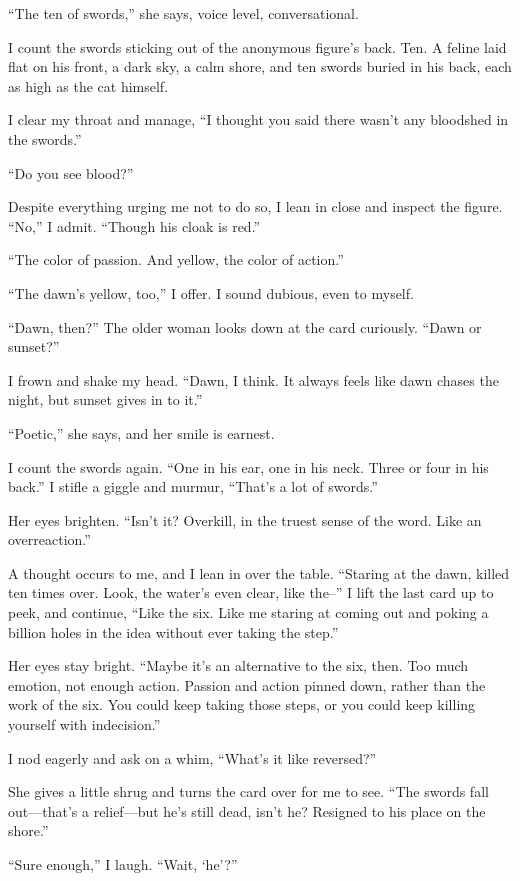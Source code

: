 ``The ten of swords,'' she says, voice level, conversational.

I count the swords sticking out of the anonymous figure's back. Ten. A feline laid flat on his front, a dark sky, a calm shore, and ten swords buried in his back, each as high as the cat himself.

I clear my throat and manage, ``I thought you said there wasn't any bloodshed in the swords.''

``Do you see blood?''

Despite everything urging me not to do so, I lean in close and inspect the figure. ``No,'' I admit. ``Though his cloak is red.''

``The color of passion. And yellow, the color of action.''

``The dawn's yellow, too,'' I offer. I sound dubious, even to myself.

``Dawn, then?'' The older woman looks down at the card curiously. ``Dawn or sunset?''

I frown and shake my head. ``Dawn, I think. It always feels like dawn chases the night, but sunset gives in to it.''

``Poetic,'' she says, and her smile is earnest.

I count the swords again. ``One in his ear, one in his neck. Three or four in his back.'' I stifle a giggle and murmur, ``That's a lot of swords.''

Her eyes brighten. ``Isn't it? Overkill, in the truest sense of the word. Like an overreaction.''

A thought occurs to me, and I lean in over the table. ``Staring at the dawn, killed ten times over. Look, the water's even clear, like the--'' I lift the last card up to peek, and continue, ``Like the six. Like me staring at coming out and poking a billion holes in the idea without ever taking the step.''

Her eyes stay bright. ``Maybe it's an alternative to the six, then. Too much emotion, not enough action. Passion and action pinned down, rather than the work of the six. You could keep taking those steps, or you could keep killing yourself with indecision.''

I nod eagerly and ask on a whim, ``What's it like reversed?''

She gives a little shrug and turns the card over for me to see. ``The swords fall out---that's a relief---but he's still dead, isn't he? Resigned to his place on the shore.''

``Sure enough,'' I laugh. ``Wait, `he'?''

